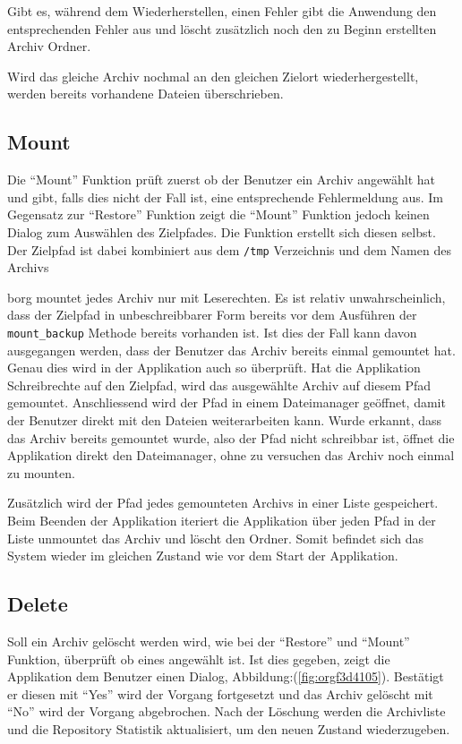 Gibt es, während dem Wiederherstellen, einen Fehler gibt die Anwendung den
entsprechenden Fehler aus und löscht zusätzlich noch den zu Beginn erstellten
Archiv Ordner.

Wird das gleiche Archiv nochmal an den gleichen Zielort wiederhergestellt,
werden bereits vorhandene Dateien überschrieben.

\subsection{Mount}
\label{sec:orgb1a6a89}

Die "`Mount"' Funktion prüft zuerst ob der Benutzer ein Archiv angewählt hat und
gibt, falls dies nicht der Fall ist, eine entsprechende Fehlermeldung aus. Im
Gegensatz zur "`Restore"' Funktion zeigt die "`Mount"' Funktion jedoch keinen
Dialog zum Auswählen des Zielpfades. Die Funktion erstellt sich diesen selbst.
Der Zielpfad ist dabei kombiniert aus dem \texttt{/tmp} Verzeichnis und dem Namen des
Archivs

\gls{borg} mountet jedes Archiv nur mit Leserechten. Es ist relativ
unwahrscheinlich, dass der Zielpfad in unbeschreibbarer Form bereits vor dem
Ausführen der \texttt{mount\_backup} Methode bereits vorhanden ist. Ist dies der Fall
kann davon ausgegangen werden, dass der Benutzer das Archiv bereits einmal
gemountet hat. Genau dies wird in der Applikation auch so überprüft. Hat die
Applikation Schreibrechte auf den Zielpfad, wird das ausgewählte Archiv auf
diesem Pfad gemountet. Anschliessend wird der Pfad in einem Dateimanager
geöffnet, damit der Benutzer direkt mit den Dateien weiterarbeiten kann. Wurde
erkannt, dass das Archiv bereits gemountet wurde, also der Pfad nicht
schreibbar ist, öffnet die Applikation direkt den Dateimanager, ohne zu
versuchen das Archiv noch einmal zu mounten.

Zusätzlich wird der Pfad jedes gemounteten Archivs in einer Liste gespeichert.
Beim Beenden der Applikation iteriert die Applikation über jeden Pfad in der
Liste unmountet das Archiv und löscht den Ordner. Somit befindet sich das
System wieder im gleichen Zustand wie vor dem Start der Applikation.

\subsection{Delete}
\label{sec:org387e3f8}

Soll ein Archiv gelöscht werden wird, wie bei der "`Restore"' und "`Mount"'
Funktion, überprüft ob eines angewählt ist. Ist dies gegeben, zeigt die
Applikation dem Benutzer einen Dialog, Abbildung:(\ref{fig:orgf3d4105}). Bestätigt er
diesen mit "`Yes"' wird der Vorgang fortgesetzt und das Archiv gelöscht mit "`No"'
wird der Vorgang abgebrochen. Nach der Löschung werden die Archivliste und die
Repository Statistik aktualisiert, um den neuen Zustand wiederzugeben.

